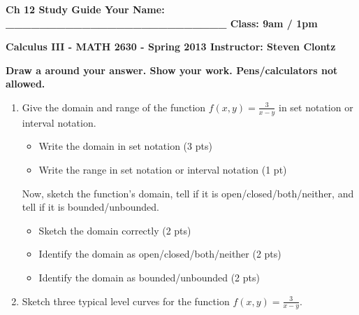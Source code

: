 \documentclass[12pt]{article}
\newcommand{\up}{$~$\vspace*{-0.7in}}
\newcommand{\liner}{\noindent\underline{\hspace*{7in}}}
\newcommand{\spac}{\hspace*{3em}}
\begin{document}
\up

{\bf Ch 12 Study Guide  \hspace*{1em} Your Name: \_\_\_\_\_\_\_\_\_\_\_\_\_\_\_\_\_\_\_\_\_\_\_\_\_\_ \hspace*{1em} Class: 9am / 1pm}

\vspace*{0.2in}

\centerline{ \bf Calculus III - MATH 2630 - Spring 2013 \spac Instructor: Steven Clontz}

\vspace*{0.2in}

{\bf Draw a  around your answer. Show your work. Pens/calculators not allowed.}

\indent\liner


\begin{enumerate}

\item Give the domain and range of the function $f(x,y) = \frac{3}{x-y}$ in set notation or interval notation.

  \begin{itemize}
    \item Write the domain in set notation (3 pts)
    \item Write the range in set notation or interval notation (1 pt)
  \end{itemize}

\vspace*{2.5in}

Now, sketch the function's domain, tell if it is open/closed/both/neither, and tell if it is bounded/unbounded.

  \begin{itemize}
    \item Sketch the domain correctly (2 pts)
    \item Identify the domain as open/closed/both/neither (2 pts)
    \item Identify the domain as bounded/unbounded (2 pts)
  \end{itemize}

\vspace*{3in}

\liner

\newpage


\item Sketch three typical level curves for the function $f(x,y) = \frac{3}{x-y}$.


\end{enumerate}
\end{document}
